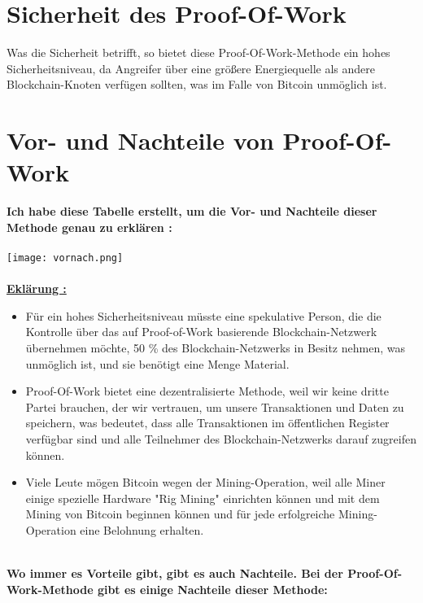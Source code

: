 \documentclass[ngerman]{scrreprt}
\begin{document}
\section{Sicherheit des Proof-Of-Work}
Was die Sicherheit betrifft, so bietet diese Proof-Of-Work-Methode ein hohes Sicherheitsniveau, da Angreifer über eine größere Energiequelle als andere Blockchain-Knoten verfügen sollten, was im Falle von Bitcoin unmöglich ist.

\newpage
\section{Vor- und Nachteile von Proof-Of-Work}
\textbf{Ich habe diese Tabelle erstellt, um die Vor- und Nachteile dieser Methode genau zu erklären : } \\ \\
\texttt{[image: vornach.png]} \\ \\
\textbf{\underline{Eklärung :}}
\begin{itemize}
	\item Für ein hohes Sicherheitsniveau müsste eine spekulative Person, die die Kontrolle über das auf Proof-of-Work basierende Blockchain-Netzwerk übernehmen möchte, 50 \% des
	Blockchain-Netzwerks in Besitz nehmen, was unmöglich ist, und sie benötigt eine Menge Material.
	\item Proof-Of-Work bietet eine dezentralisierte Methode, weil wir keine dritte Partei brauchen, der wir vertrauen, um unsere Transaktionen und Daten zu speichern, was bedeutet, dass alle Transaktionen im öffentlichen Register verfügbar sind und alle Teilnehmer des Blockchain-Netzwerks darauf zugreifen können.
	\item Viele Leute mögen Bitcoin wegen der Mining-Operation, weil alle Miner einige spezielle Hardware "Rig Mining" einrichten können und mit dem Mining von Bitcoin beginnen können und für jede erfolgreiche Mining-Operation eine Belohnung erhalten. \\  \\
\end{itemize}
\textbf{Wo immer es Vorteile gibt, gibt es auch Nachteile. Bei der Proof-Of-Work-Methode gibt es einige Nachteile dieser Methode: }
\end{document}
